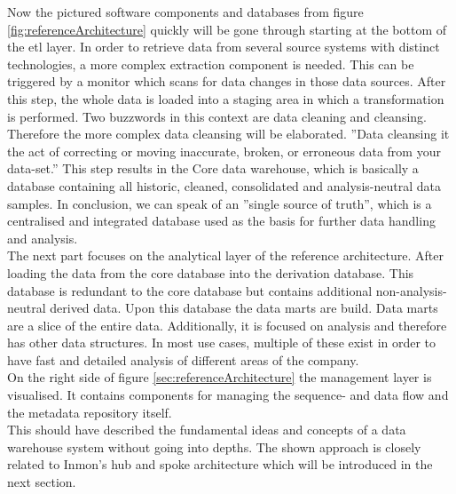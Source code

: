 Now the pictured software components and databases from figure \ref{fig:referenceArchitecture} quickly  will be gone through starting at the bottom of the \acrfull{etl} layer. In order to retrieve data from several source systems with distinct technologies, a more complex extraction component is needed. This can be triggered by a monitor which scans for data changes in those data sources.\newline
After this step, the whole data is loaded into a staging area in which a transformation is performed. Two buzzwords in this context are data cleaning and cleansing. Therefore the more complex data cleansing will be elaborated.
''Data cleansing it the act of correcting or moving inaccurate, broken, or erroneous data from your data-set.'' \cite{dataCleansing}
This step results in the Core data warehouse, which is basically a database containing all historic, cleaned, consolidated and analysis-neutral data samples. In conclusion, we can speak of an ''single source of truth''\cite{scriptRasch}, which is a centralised and integrated database used as the basis for further data handling and analysis.\newline
\\
The next part focuses on the analytical layer of the reference architecture. After loading the data from the core database into the derivation database. This database is redundant to the core database but contains additional non-analysis-neutral derived data. Upon this database the data marts are build. Data marts are a slice of the entire data. Additionally, it is focused on analysis and therefore has other data structures. In most use cases, multiple of these exist in order to have fast and detailed analysis of different areas of the company.\newline
\\
On the right side of figure \ref{sec:referenceArchitecture} the management layer is visualised. It contains components for managing the sequence- and data flow and the metadata repository itself.\newline
\\
This should have described the fundamental ideas and concepts of a data warehouse system without going into depths. The shown approach is closely related to Inmon's hub and spoke architecture which will be introduced in the next section. 
